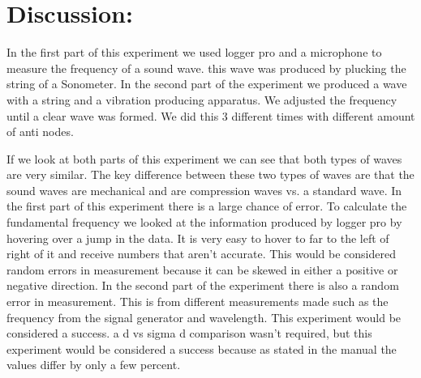 \documentclass{article}
\begin{document}
\section*{Discussion:}
\doublespace
In the first part of this experiment we used logger pro and a microphone to measure the frequency of a sound wave.  this wave was produced by plucking the string of a Sonometer.  In the second part of the experiment we produced a wave with a string and a vibration producing apparatus.  We adjusted the frequency until a clear wave was formed.  We did this 3 different times with different amount of anti nodes.  

 If we look at both parts of this experiment we can see that both types of waves are very similar.  The key difference between these two types of waves are that the sound waves are mechanical and are compression waves vs. a standard wave.  In the first part of this experiment there is a large chance of error.  To calculate the fundamental frequency we looked at the information produced by logger pro by hovering over a jump in the data. It is very easy to hover to far to the left of right of it and receive numbers that aren't accurate.  This would be considered random errors in measurement because it can be skewed in either a positive or negative direction.  In the second part of the experiment there is also a random error in measurement.  This is from different measurements made such as the frequency from the signal generator and wavelength.  This experiment would be considered a success.  a d vs sigma d comparison wasn't required, but this experiment would be considered a success because as stated in the manual the values differ by only a few percent.
  
\end{document}
